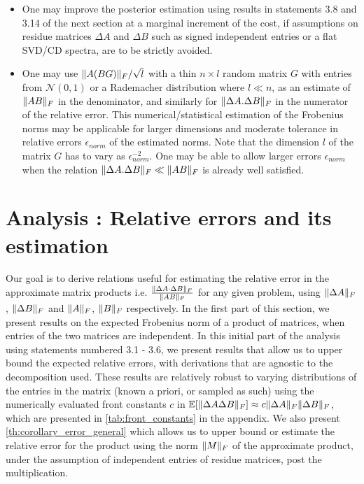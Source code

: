 \documentclass[onefignum,onetabnum]{siamart171218}
\DeclarePairedDelimiter\norm{\lVert}{\rVert}
\begin{document}
\begin{itemize}
    \item One may improve the posterior estimation using results in statements 3.8 and 3.14 of the next section at a marginal increment of the cost, if assumptions on residue matrices $\Delta A$ and $\Delta B$ such as signed independent entries or a flat SVD/CD spectra, are to be strictly avoided.
    \item One may use $\norm{A(BG)}_F/\sqrt{l}$ with a thin $n \times l$ random matrix $G$ with entries from $\mathcal{N}(0,1)$ or a Rademacher distribution \cite{Hutchinson_1989} where $l \ll n$, as an estimate of $\norm{AB}_F$ in the denominator, and similarly for $\norm{\Delta A.\Delta B}_F$ in the numerator of the relative error. This numerical/statistical estimation of the Frobenius norms may be applicable for larger dimensions and moderate tolerance in relative errors $\epsilon_{norm}$ of the estimated norms. Note that the dimension $l$ of the matrix $G$ has to vary as $\epsilon_{norm}^{-2}$. One may be able to allow larger errors $\epsilon_{norm}$ when the relation $\norm{\Delta A.\Delta B}_F \ll \norm{AB}_F$ is already well satisfied.
\end{itemize}


\section{Analysis : Relative errors and its estimation}\label{sec:analysis}

Our goal is to derive relations useful for estimating the relative error in the approximate matrix products i.e. $\frac{\norm{\Delta A \cdot \Delta B}_F} {\norm{AB}_F}$ for any given problem, using $\norm{\Delta A}_F$, $\norm{\Delta B}_F$ and $\norm{A}_F$, $\norm{B}_F$ respectively. In the first part of this section, we present results on the expected Frobenius norm of a product of matrices, when entries of the two matrices are independent. In this initial part of the analysis using statements numbered 3.1 - 3.6, we present results that allow us to upper bound the expected relative errors, with derivations that are agnostic to the decomposition used. These results are relatively robust to varying distributions of the entries in the matrix (known a priori, or sampled as such) using the numerically evaluated front constants $c$ in $\mathbb{E}[\norm{\Delta A \Delta B}_F] \approx c \norm{\Delta A}_F \norm{\Delta B}_F$, which are presented in \cref{tab:front_constants} in the appendix. We also present \cref{th:corollary_error_general} which allows us to upper bound or estimate the relative error for the product using the norm $\norm{M}_F$ of the approximate product, under the assumption of independent entries of residue matrices, post the multiplication.
\end{document}
